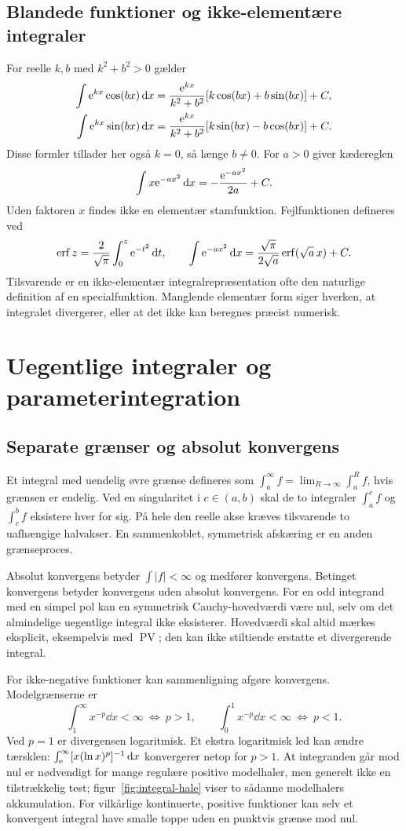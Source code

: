 \subsection{Blandede funktioner og ikke-elementære integraler}
For reelle $k,b$ med $k^2+b^2>0$ gælder
\begin{align*}
 \int\mathrm{e}^{kx}\cos(bx)\mathop{}\!\mathrm{d} x
 &=\frac{\mathrm{e}^{kx}}{k^2+b^2}[k\cos(bx)+b\sin(bx)]+C,\\
 \int\mathrm{e}^{kx}\sin(bx)\mathop{}\!\mathrm{d} x
 &=\frac{\mathrm{e}^{kx}}{k^2+b^2}[k\sin(bx)-b\cos(bx)]+C.
\end{align*}
Disse formler tillader her også $k=0$, så længe $b\ne0$. For $a>0$
giver kædereglen
\[
 \int x\mathrm{e}^{-ax^2}\mathop{}\!\mathrm{d} x=-\frac{\mathrm{e}^{-ax^2}}{2a}+C.
\]
Uden faktoren $x$ findes ikke en elementær stamfunktion. Fejlfunktionen
defineres ved
\[
 \operatorname{erf}z=\frac2{\sqrt\pi}\int_0^z\mathrm{e}^{-t^2}\mathop{}\!\mathrm{d} t,
 \qquad
 \int\mathrm{e}^{-ax^2}\mathop{}\!\mathrm{d} x=\frac{\sqrt\pi}{2\sqrt a}
             \operatorname{erf}(\sqrt a\,x)+C.
\]
Tilsvarende er en ikke-elementær integralrepræsentation ofte den naturlige
definition af en specialfunktion. Manglende elementær form siger hverken,
at integralet divergerer, eller at det ikke kan beregnes præcist numerisk.

\section{Uegentlige integraler og parameterintegration}
\label{sec:uegentlig-integral}
\subsection{Separate grænser og absolut konvergens}
Et integral med uendelig øvre grænse defineres som
$\int_a^\infty f=\lim_{R\to\infty}\int_a^R f$, hvis grænsen er endelig.
Ved en singularitet i $c\in(a,b)$ skal de to integraler
$\int_a^c f$ og $\int_c^b f$ eksistere hver for sig. På hele den reelle
akse kræves tilsvarende to uafhængige halvakser. En sammenkoblet,
symmetrisk afskæring er en anden grænseproces.

Absolut konvergens betyder $\int|f|<\infty$ og medfører konvergens.
Betinget konvergens betyder konvergens uden absolut konvergens. For
en odd integrand med en simpel pol kan en symmetrisk Cauchy-hovedværdi
være nul, selv om det almindelige uegentlige integral ikke eksisterer.
Hovedværdi skal altid mærkes eksplicit, eksempelvis med
$\operatorname{PV}$; den kan ikke stiltiende erstatte et divergerende integral.

For ikke-negative funktioner kan sammenligning afgøre konvergens.
Modelgrænserne er
\[
 \int_1^\infty x^{-p}\dd x<\infty\ \Longleftrightarrow\ p>1,
 \qquad
 \int_0^1 x^{-p}\dd x<\infty\ \Longleftrightarrow\ p<1.
\]
Ved $p=1$ er divergensen logaritmisk. Et ekstra logaritmisk led kan
ændre tærsklen: $\int_{\mathrm{e}}^\infty[x(\ln x)^p]^{-1}\mathop{}\!\mathrm{d} x$ konvergerer
netop for $p>1$. At integranden går mod nul er nødvendigt for mange
regulære positive modelhaler, men generelt ikke en tilstrækkelig test;
figur~\ref{fig:integral-hale} viser to sådanne modelhalers akkumulation.
For vilkårlige kontinuerte, positive funktioner kan selv et konvergent
integral have smalle toppe uden en punktvis grænse mod nul.

